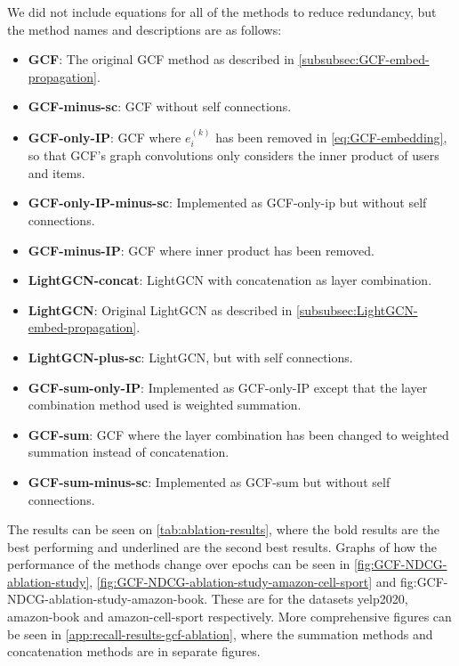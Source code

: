 We did not include equations for all of the methods to reduce redundancy, but the method names and descriptions are as follows:
\begin{itemize}
    \item \textbf{GCF}: The original GCF method as described in \autoref{subsubsec:GCF-embed-propagation}.
    \item \textbf{GCF-minus-sc}: GCF without self connections.
    \item \textbf{GCF-only-IP}:  GCF where $e_i^{(k)}$ has been removed in \autoref{eq:GCF-embedding}, so that GCF's graph convolutions only considers the inner product of users and items.
    \item \textbf{GCF-only-IP-minus-sc}: Implemented as GCF-only-ip but without self connections.
    \item \textbf{GCF-minus-IP}: GCF where inner product has been removed.
    \item \textbf{LightGCN-concat}: LightGCN with concatenation as layer combination.
    \item \textbf{LightGCN}: Original LightGCN as described in \autoref{subsubsec:LightGCN-embed-propagation}.
    \item \textbf{LightGCN-plus-sc}: LightGCN, but with self connections.
    \item \textbf{GCF-sum-only-IP}: Implemented as GCF-only-IP except that the layer combination method used is weighted summation.
    \item \textbf{GCF-sum}: GCF where the layer combination has been changed to weighted summation instead of concatenation.
    \item \textbf{GCF-sum-minus-sc}: Implemented as GCF-sum but without self connections.
\end{itemize}
The results can be seen on \autoref{tab:ablation-results}, where the bold results are the best performing and underlined are the second best results.
Graphs of how the performance of the methods change over epochs can be seen in \autoref{fig:GCF-NDCG-ablation-study}, \autoref{fig:GCF-NDCG-ablation-study-amazon-cell-sport} and {fig:GCF-NDCG-ablation-study-amazon-book}.
These are for the datasets yelp2020, amazon-book and amazon-cell-sport respectively.
More comprehensive figures can be seen in \ref{app:recall-results-gcf-ablation}, where the summation methods and concatenation methods are in separate figures.
